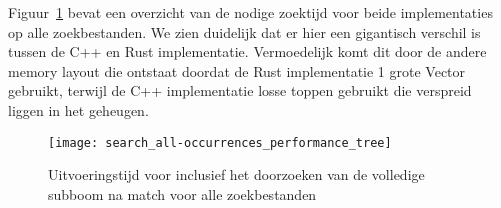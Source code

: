 Figuur~\ref{fig:performance_all-occurrences_tree} bevat een overzicht van de nodige zoektijd voor beide implementaties op alle zoekbestanden.
We zien duidelijk dat er hier een gigantisch verschil is tussen de C++ en Rust implementatie.
Vermoedelijk komt dit door de andere memory layout die ontstaat doordat de Rust implementatie 1 grote Vector gebruikt, terwijl de C++ implementatie losse toppen gebruikt die verspreid liggen in het geheugen.

\begin{figure}[H]
    \centering
    \texttt{[image: search\_all-occurrences\_performance\_tree]}
    \caption{Uitvoeringstijd voor inclusief het doorzoeken van de volledige subboom na match voor alle zoekbestanden}
    \label{fig:performance_all-occurrences_tree}
\end{figure}


